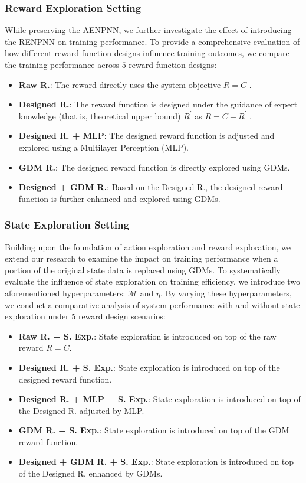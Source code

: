 \documentclass[comsoc,journal]{IEEEtran}
\begin{document}
\subsubsection{Reward Exploration Setting}
While preserving the AENPNN, we further investigate the effect of introducing the RENPNN on training performance. To provide a comprehensive evaluation of how different reward function designs influence training outcomes, we compare the training performance across $5$ reward function designs:
\begin{itemize}
    \item \textbf{Raw R.}: The reward directly uses the system objective $R=C$ \cite{nayak2024drl}.
    \item \textbf{Designed R.}: The reward function is designed under the guidance of expert knowledge (that is, theoretical upper bound) $R^{'}$ as $R=C-R^{'}$ \cite{du2024enhancing}.
    \item \textbf{Designed R. + MLP}: The designed reward function is adjusted and explored using a Multilayer Perception (MLP).
    \item \textbf{GDM R.}: The designed reward function is directly explored using GDMs.
    \item \textbf{Designed + GDM R.}: Based on the Designed R., the designed reward function is further enhanced and explored using GDMs.
\end{itemize}

\subsubsection{State Exploration Setting}
Building upon the foundation of action exploration and reward exploration, we extend our research to examine the impact on training performance when a portion of the original state data is replaced using GDMs. To systematically evaluate the influence of state exploration on training efficiency, we introduce two aforementioned hyperparameters: $\mathcal{M}$ and $\eta$. By varying these hyperparameters, we conduct a comparative analysis of system performance with and without state exploration under $5$ reward design scenarios:
\begin{itemize}
    \item \textbf{Raw R. + S. Exp.}: State exploration is introduced on top of the raw reward $R=C$.
    \item \textbf{Designed R. + S. Exp.}: State exploration is introduced on top of the designed reward function.
    \item \textbf{Designed R. + MLP + S. Exp.}: State exploration is introduced on top of the Designed R. adjusted by MLP.
    \item \textbf{GDM R. + S. Exp.}: State exploration is introduced on top of the GDM reward function.
    \item \textbf{Designed + GDM R. + S. Exp.}: State exploration is introduced on top of the Designed R. enhanced by GDMs.
\end{itemize}
\end{document}
